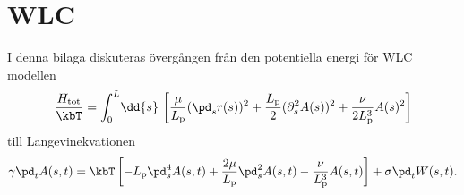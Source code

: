 \chapter{WLC}
\label{A5}

I denna bilaga diskuteras övergången från den potentiella energi för WLC modellen 
\begin{equation}\label{eq:Htot}
    \frac{H_\text{tot}}{\kbT}=\int_{0}^{L}\!\dd{s}\,\left[\frac{\mu}{L_\text{p}}(\pd_{s}r(s))^{2}+\frac{L_\text{p}}{2}(\partial_{s}^{2}A(s))^2 + \frac{\nu}{2L_\text{p}^3} A(s)^2\right]
\end{equation}
till Langevinekvationen 
\begin{equation}\label{eq:wlclangevin}
    \gamma\pd_tA(s,t) = \kbT\left[-L_\text{p}\pd_s^4A(s,t)+\frac{2\mu}{L_\text{p}}\pd_s^2A(s,t)-\frac{\nu}{L_\text{p}^3}A(s,t) \right]+\sigma\pd_tW(s,t).
\end{equation}

